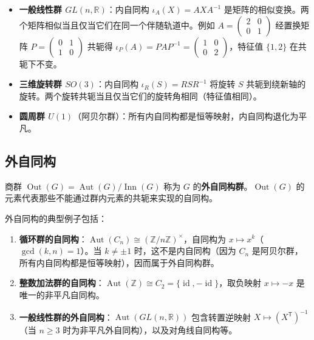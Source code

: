 \begin{example}[内自同构的实例]\label{ex:rotation_operation_examples}
\begin{itemize}
    \item \textbf{一般线性群 $GL(n,\mathbb{R})$}：内自同构 $\iota_A(X) = AXA^{-1}$ 是矩阵的相似变换。两个矩阵相似当且仅当它们在同一个伴随轨道中。例如 $A=\begin{pmatrix}2&0\\0&1\end{pmatrix}$ 经置换矩阵 $P=\begin{pmatrix}0&1\\1&0\end{pmatrix}$ 共轭得 $\iota_P(A)=PAP^{-1}=\begin{pmatrix}1&0\\0&2\end{pmatrix}$，特征值 $\{1,2\}$ 在共轭下不变。
    \item \textbf{三维旋转群 $SO(3)$}：内自同构 $\iota_R(S) = RSR^{-1}$ 将旋转 $S$ 共轭到绕新轴的旋转。两个旋转共轭当且仅当它们的旋转角相同（特征值相同）。
    \item \textbf{圆周群 $U(1)$}（阿贝尔群）：所有内自同构都是恒等映射，内自同构退化为平凡。
\end{itemize}
\end{example}

\subsection{\texorpdfstring{外自同构}{外自同构}}
\label{subsec:outer_automorphism}

\begin{definition}[外自同构群]\label{def:group_scaling_operation}
商群 $\operatorname{Out}(G) = \operatorname{Aut}(G) / \operatorname{Inn}(G)$ 称为 $G$ 的\textbf{外自同构群}。$\operatorname{Out}(G)$ 的元素代表那些不能通过群内元素的共轭来实现的自同构。

外自同构的典型例子包括：
\begin{enumerate}[label=(\roman*)]
    \item \textbf{循环群的自同构}：$\operatorname{Aut}(C_n) \cong (\mathbb{Z}/n\mathbb{Z})^\times$，自同构为 $x \mapsto x^k$（$\gcd(k,n)=1$）。当 $k \neq \pm 1$ 时，这不是内自同构（因为 $C_n$ 是阿贝尔群，所有内自同构都是恒等映射），因而属于外自同构群。
    \item \textbf{整数加法群的自同构}：$\operatorname{Aut}(\mathbb{Z}) \cong C_2 = \{\operatorname{id}, -\operatorname{id}\}$，取负映射 $x \mapsto -x$ 是唯一的非平凡自同构。
    \item \textbf{一般线性群的外自同构}：$\operatorname{Aut}(GL(n,\mathbb{R}))$ 包含转置逆映射 $X \mapsto (X^{\mathsf T})^{-1}$（当 $n \ge 3$ 时为非平凡外自同构），以及对角线自同构等。
\end{enumerate}
\end{definition}

